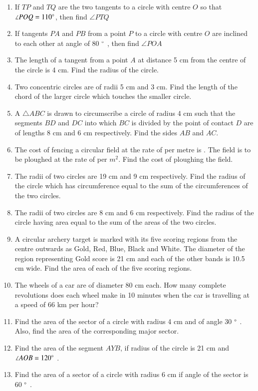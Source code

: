 \begin{enumerate}[label=\arabic*.,ref=\thesubsection.\theenumi]
\item  If $TP$ and $TQ$ are the two tangents to a circle with centre $O$ so that  $\angle  POQ = 110 \degree $, then find  $\angle  PTQ$
\item  If tangents $PA$ and $PB$ from a point $P$ to a circle with centre $O$ are inclined to each other at angle of 80 $\degree$ , then find  $\angle  POA $
%
\item The length of a tangent from a point $A$ at distance 5 cm from the centre of the circle is 4 cm. Find the radius of the circle.
\item  Two concentric circles are of radii 5 cm and 3 cm. Find the length of the chord of the larger circle which touches the smaller circle.
%
\item A $\triangle ABC$ is drawn to circumscribe a circle of radius 4 cm such that the segments $BD$ and $DC$ into which $BC$ is divided by the point of contact $D$ are of lengths 8 cm and 6 cm respectively. Find the sides $AB$ and $AC$.
%
\item The cost of fencing a circular field at the rate of  per metre is . The field is to be ploughed at the rate of  per $m^2$.  Find the cost of ploughing the field.	
\item The radii of two circles are 19 cm and 9 cm respectively. Find the radius of the circle which has circumference equal to the sum of the circumferences of the two circles.
\item The radii of two circles are 8 cm and 6 cm respectively. Find the radius of the circle having area equal to the sum of the areas of the two circles.
\item A circular  archery target is marked with its five scoring regions from the centre outwards as Gold, Red, Blue, Black and White. The diameter of the region representing Gold score is 21 cm and each of the other bands is 10.5 cm wide. Find the area of each of the five scoring regions.
\item The wheels of a car are of diameter 80 cm each. How many complete revolutions does each wheel make in 10 minutes when the car is travelling at a speed of 66 km per hour?
%
 \item Find the area of the sector of a circle with radius 4 cm and of angle 30 $\degree$ . Also, find the area of the corresponding major sector.
\item Find the area of the segment $AYB$, if radius of the circle is 21 cm and
 $\angle  AOB = 120 \degree$ .
%
\item Find the area of a sector of a circle with radius 6 cm if angle of the sector is 60 $\degree$ . 

\end{enumerate}
